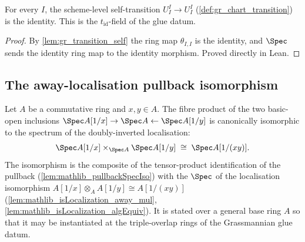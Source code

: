 \begin{lemma}

  \label{lem:gr_chartTransition_self}
  For every \(I\), the scheme-level self-transition
  \(U^I_I \to U^I_I\) (\cref{def:gr_chart_transition}) is the identity. This is
  the \(t_{\mathrm{id}}\)-field of the glue datum.
\end{lemma}
\begin{proof}
  \leanok
  By \cref{lem:gr_transition_self} the ring map \(\theta_{I,I}\) is the identity,
  and \(\Spec\) sends the identity ring map to the identity morphism. Proved
  directly in Lean.
\end{proof}

\subsection*{The away-localisation pullback isomorphism}

\begin{definition}

  \label{def:gr_away_pullback_iso}
  Let \(A\) be a commutative ring and \(x, y \in A\). The fibre product of the two
  basic-open inclusions \(\Spec A[1/x] \to \Spec A \leftarrow \Spec A[1/y]\) is
  canonically isomorphic to the spectrum of the doubly-inverted localisation:
  \[
    \Spec A[1/x] \times_{\Spec A} \Spec A[1/y]
      \;\cong\; \Spec A[1/(xy)].
  \]
  The isomorphism is the composite of the tensor-product identification of the
  pullback (\cref{lem:mathlib_pullbackSpecIso}) with the \(\Spec\) of the
  localisation isomorphism
  \(A[1/x] \otimes_A A[1/y] \cong A[1/(xy)]\)
  (\cref{lem:mathlib_isLocalization_away_mul},
  \cref{lem:mathlib_isLocalization_algEquiv}). It is stated over a general base
  ring \(A\) so that it may be instantiated at the triple-overlap rings of the
  Grassmannian glue datum.
\end{definition}

